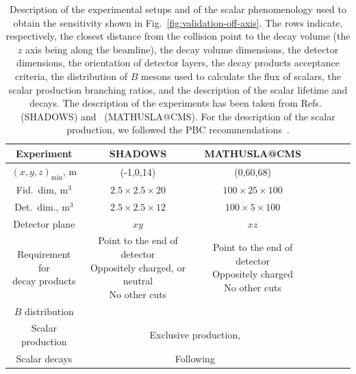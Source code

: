 \documentclass[
    aps,prd,
    twocolumn,
    nofootinbib,
    superscriptaddress,
]{revtex4}
\begin{document}
\begin{table}
    \centering
    \begin{tabular}{|c|c|c|c|c|c|c|}
      \hline Experiment & SHADOWS & MATHUSLA@CMS   \\ \hline
      $(x,y, z)_{\text{min}}$, m  & (-1,0,14) & (0,60,68) \\ \hline
     Fid.\ dim, $\text{m}^{3}$   & $2.5\times 2.5\times 20$  & $100\times 25\times 100$ \\ \hline
      Det.\ dim., $\text{m}^{3}$  & $2.5\times 2.5\times 12$ & $100\times 5\times 100$ \\ \hline
      Detector plane & $xy$ & $xz$ \\ \hline
       \makecell{Requirement for \\ decay products}   & \makecell{Point to the end of detector \\ Oppositely charged, or neutral\\ No other cuts} & \makecell{Point to the end of detector \\ Oppositely charged \\ No other cuts} \\ \hline
       $B$ distribution & \cite{CERN-SHiP-NOTE-2015-009} & \cite{Kling:2021fwx} \\ \hline
        Scalar production      & \multicolumn{2}{c|}{Exclusive production,~\cite{Boiarska:2019jym}} \\ \hline
         Scalar decays & \multicolumn{2}{c|}{Following~\cite{Boiarska:2019jym}} \\ \hline
    \end{tabular}
    \caption{Description of the experimental setups and of the scalar phenomenology used to obtain the sensitivity shown in Fig.~\ref{fig:validation-off-axis}. The rows indicate, respectively, the closest distance from the collision point to the decay volume (the $z$ axis being along the beamline), the decay volume dimensions, the detector dimensions, the orientation of detector layers, the decay products acceptance criteria, the distribution of $B$ mesons used to calculate the flux of scalars, the scalar production branching ratios, and the description of the scalar lifetime and decays. The description of the experiments has been taken from Refs.~\cite{Alviggi:2839484} (SHADOWS) and~\cite{MATHUSLA:2022sze} (MATHUSLA@CMS). For the description of the scalar production, we followed the PBC recommendations~\cite{Beacham:2019nyx}.}
    \label{tab:comparison-with-FIPMC}
\end{table}
\end{document}
